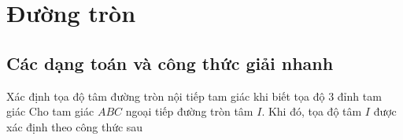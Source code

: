 \section{Đường tròn}
\subsection{Các dạng toán và công thức giải nhanh}

\begin{dang}{Xác định tọa độ tâm đường tròn nội tiếp tam giác khi biết tọa độ $3$ đỉnh tam giác}
Cho tam giác $ABC$ ngoại tiếp đường tròn tâm $I$. Khi đó, tọa độ tâm $I$ được xác định theo công thức sau\\
\end{dang}
